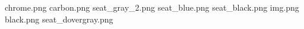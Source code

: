 chrome.png
carbon.png
seat_gray_2.png
seat_blue.png
seat_black.png
img.png
black.png
seat_dovergray.png
